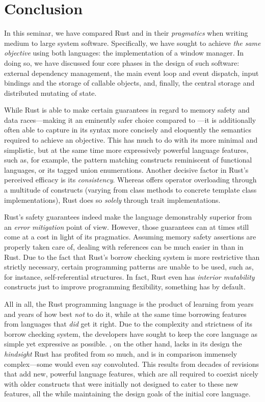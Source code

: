 \section{Conclusion}

In this seminar, we have compared Rust and \cpp in their \textit{pragmatics}
when writing medium to large system software. Specifically, we have sought to
achieve \textit{the same objective} using both languages: the implementation of
a window manager. In doing so, we have discussed four core phases in the design
of such software: external dependency management, the main event loop and event
dispatch, input bindings and the storage of callable objects, and, finally, the
central storage and distributed mutating of state.

While Rust is able to make certain guarantees in regard to memory safety and
data races---making it an eminently safer choice compared to \cpp---it is
additionally often able to capture in its syntax more concisely and eloquently
the semantics required to achieve an objective. This has much to do with its
more minimal and simplistic, but at the same time more expressively powerful
language features, such as, for example, the pattern matching constructs
reminiscent of functional languages, or its tagged union enumerations. Another
decisive factor in Rust's perceived efficacy is its \textit{consistency}.
Whereas \cpp offers operator overloading through a multitude of constructs
(varying from class methods to concrete template class implementations), Rust
does so \textit{solely} through trait implementations.

Rust's safety guarantees indeed make the language demonstrably superior from
an \textit{error mitigation} point of view. However, those guarantees can at
times still come at a cost in light of its pragmatics. Assuming memory safety
assertions are properly taken care of, dealing with references can be much
easier in \cpp than in Rust. Due to the fact that Rust's borrow checking system
is more restrictive than strictly necessary, certain programming patterns are
unable to be used, such as, for instance, self-referential structures. In
fact, Rust even has \textit{interior mutability} constructs just to improve
programming flexibility, something \cpp has by default.

All in all, the Rust programming language is the product of learning from years
and years of how best \textit{not} to do it, while at the same time borrowing
features from languages that \textit{did} get it right. Due to the complexity
and strictness of its borrow checking system, the developers have sought to
keep the core language as simple yet expressive as possible. \cpp, on the other
hand, lacks in its design the \textit{hindsight} Rust has profited from so much,
and is in comparison immensely complex---some would even say convoluted. This
results from decades of revisions that add new, powerful language features,
which are all required to coexist nicely with older constructs that were
initially not designed to cater to these new features, all the while maintaining
the design goals of the initial core language.
